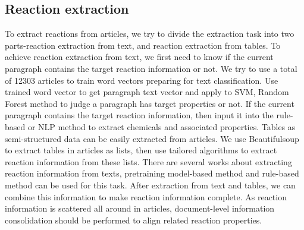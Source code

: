 \documentclass[%
 aip,
 jmp,%
 amsmath,amssymb,
 reprint,%
]{revtex4-2}
\begin{document}
\subsection{Reaction extraction}
To extract reactions from articles, we try to divide the extraction task into two parts-reaction extraction from text, 
and reaction extraction from tables. To achieve reaction extraction from text, we first need to know if the current paragraph
contains the target reaction information or not.
We try to use a total of 12303 articles to train word vectors preparing for text classification.
Use trained word vector to get paragraph text vector and apply to SVM, Random Forest method to judge a paragraph has target properties or not.
If the current paragraph contains the target reaction information, then input it into the rule-based or NLP method to extract
chemicals and associated properties.
Tables as semi-structured data can be easily extracted from articles. We use Beautifulsoup to extract tables in articles as lists,
then use tailored algorithms to extract reaction information from these lists. 
There are several works about extracting reaction information from texts, pretraining model-based method and rule-based method can be 
used for this task.
After extraction from text and tables, we can combine this information to make reaction information complete. As reaction information is 
scattered all around in articles, document-level information consolidation should be performed to align related reaction properties.
\end{document}
